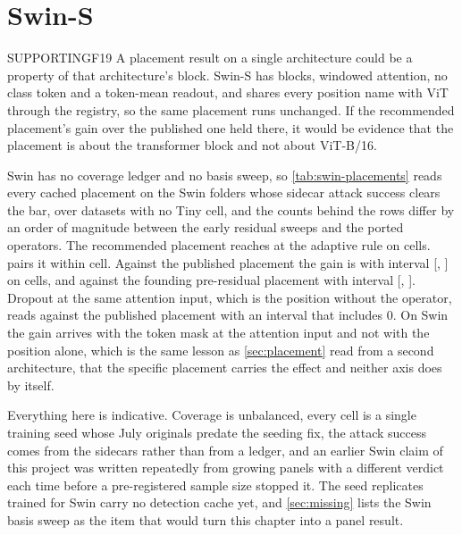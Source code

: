 \documentclass[../main.tex]{subfiles}
\begin{document}
\section{Swin-S}
\label{sec:swin}

\begin{claim}{SUPPORTING}{F19}
A placement result on a single architecture could be a property of that architecture's block. Swin-S has \SwinBlocks{} blocks, windowed attention, no class token and a token-mean readout, and shares every position name with ViT through the registry, so the same placement runs unchanged. If the recommended placement's gain over the published one held there, it would be evidence that the placement is about the transformer block and not about ViT-B/16.
\end{claim}

Swin has no coverage ledger and no basis sweep, so \cref{tab:swin-placements} reads every cached placement on the \SwinCells{} Swin folders whose sidecar attack success clears the bar, over \SwinDatasets{} datasets with no Tiny cell, and the counts behind the rows differ by an order of magnitude between the early residual sweeps and the ported operators. The recommended placement reaches \SwinRecommendedAurocAdaptive{} at the adaptive rule on \SwinRecommendedN{} cells.  pairs it within cell. Against the published placement the gain is \SwinGainRecommendedMinusPublished{} with interval [\SwinGainRecommendedMinusPublishedLow{}, \SwinGainRecommendedMinusPublishedHigh{}] on \SwinGainRecommendedMinusPublishedN{} cells, and against the founding pre-residual placement \SwinGainRecommendedMinusPreResidual{} with interval [\SwinGainRecommendedMinusPreResidualLow{}, \SwinGainRecommendedMinusPreResidualHigh{}]. Dropout at the same attention input, which is the position without the operator, reads \SwinGainDropoutInputMinusPublished{} against the published placement with an interval that includes $0$. On Swin the gain arrives with the token mask at the attention input and not with the position alone, which is the same lesson as \cref{sec:placement} read from a second architecture, that the specific placement carries the effect and neither axis does by itself.




Everything here is indicative. Coverage is unbalanced, every cell is a single training seed whose July originals predate the seeding fix, the attack success comes from the sidecars rather than from a ledger, and an earlier Swin claim of this project was written repeatedly from growing panels with a different verdict each time before a pre-registered sample size stopped it. The \SwinSeedReplicates{} seed replicates trained for Swin carry no detection cache yet, and \cref{sec:missing} lists the Swin basis sweep as the item that would turn this chapter into a panel result.
\end{document}
